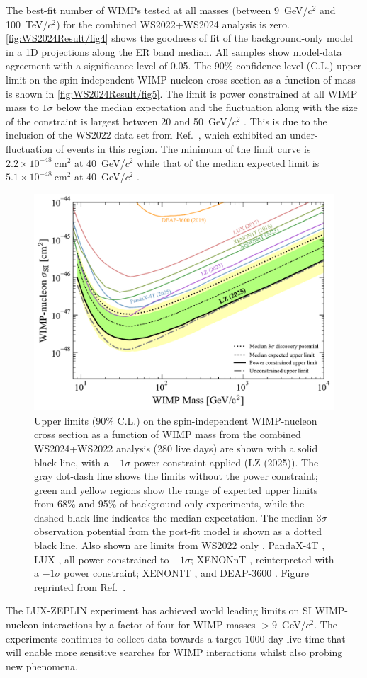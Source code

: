 The best-fit number of WIMPs tested at all masses (between 9~GeV/$c^2$ and 100~TeV/$c^2$) for the combined WS2022+WS2024 analysis is zero. \autoref{fig:WS2024Result/fig4} shows the goodness of fit of the background-only model in a 1D projections along the ER band median. All samples show model-data agreement with a significance level of 0.05. The 90\% confidence level (C.L.) upper limit on the spin-independent WIMP-nucleon cross section as a function of mass is shown in \autoref{fig:WS2024Result/fig5}. The limit is power constrained at all WIMP mass to $1\sigma$ below the median expectation and the fluctuation along with the size of the constraint is largest between 20 and 50~GeV/$c^2$ \cite{LZCollaboration:2024lux}. This is due to the inclusion of the WS2022 data set from Ref.~\cite{LZ:2022lsv}, which exhibited an under-fluctuation of events in this region. The minimum of the limit curve is $2.2\times10^{-48}~\text{cm}^2$ at 40~GeV/$c^2$ while that of the median expected limit is $5.1\times10^{-48}~\text{cm}^2$ at 40~GeV/$c^2$ \cite{LZCollaboration:2024lux}.

\begin{figure}
    \centering
    \includegraphics[width=0.7\linewidth]{figures/WS2024Result/figure5.pdf}
    \caption{Upper limits (90\% C.L.) on the spin-independent WIMP-nucleon cross section as a function of WIMP mass from the combined WS2024+WS2022 analysis (280 live days) are shown with a solid black line, with a $-1\sigma$ power constraint applied (LZ (2025)). The gray dot-dash line shows the limits without the power constraint; green and yellow regions show the range of expected upper limits from 68\% and 95\% of background-only experiments, while the dashed black line indicates the median expectation. The median $3\sigma$ observation potential from the post-fit model is shown as a dotted black line. Also shown are limits from WS2022 only \cite{LZ:2022lsv}, PandaX-4T \cite{PandaX-4T:2021bab}, LUX \cite{LUX:2016ggv}, all power constrained to $-1\sigma$; XENONnT \cite{XENONnTPres}, reinterpreted with a $-1\sigma$ power constraint; XENON1T \cite{XENON2018}, and DEAP-3600 \cite{DEAP:2019yzn}. Figure reprinted from Ref.~\cite{LZCollaboration:2024lux}.}
    \label{fig:WS2024Result/fig5}
\end{figure}

The LUX-ZEPLIN experiment has achieved world leading limits on SI WIMP-nucleon interactions by a factor of four for WIMP masses $>9$~GeV/$c^2$. The experiments continues to collect data towards a target 1000-day live time that will enable more sensitive searches for WIMP interactions whilst also probing new phenomena.
